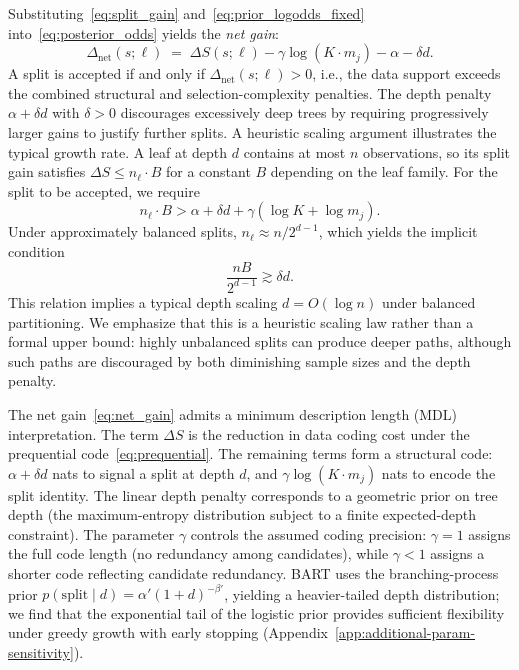 \documentclass[twoside,11pt]{article}
\begin{document}
Substituting~\eqref{eq:split_gain} and~\eqref{eq:prior_logodds_fixed} into~\eqref{eq:posterior_odds} yields the \emph{net gain}:
\begin{equation}\label{eq:net_gain}
\Delta_{\mathrm{net}}(s;\ell)
\;=\;
\Delta S(s;\ell) - \gamma\log(K \cdot m_j) - \alpha - \delta d.
\end{equation}
A split is accepted if and only if $\Delta_{\mathrm{net}}(s;\ell) > 0$, i.e., the data support exceeds the combined structural and selection-complexity penalties.
The depth penalty $\alpha + \delta d$ with $\delta > 0$ discourages excessively deep trees by requiring progressively larger gains to justify further splits. A heuristic scaling argument illustrates the typical growth rate. A leaf at depth $d$ contains at most $n$ observations, so its split gain satisfies $\Delta S \le n_\ell \cdot B$ for a constant $B$ depending on the leaf family. For the split to be accepted, we require
\[
n_\ell \cdot B > \alpha + \delta d + \gamma(\log K + \log m_j).
\]
Under approximately balanced splits, $n_\ell \approx n / 2^{d-1}$, which yields the implicit condition
\[
\frac{n B}{2^{d-1}} \gtrsim \delta d.
\]
This relation implies a typical depth scaling $d = O(\log n)$ under balanced partitioning. We emphasize that this is a heuristic scaling law rather than a formal upper bound: highly unbalanced splits can produce deeper paths, although such paths are discouraged by both diminishing sample sizes and the depth penalty.

\begin{remark}\label{rem:mdl}
The net gain~\eqref{eq:net_gain} admits a minimum description length (MDL) interpretation. The term $\Delta S$ is the reduction in data coding cost under the prequential code~\eqref{eq:prequential}. The remaining terms form a structural code: $\alpha + \delta d$ nats to signal a split at depth $d$, and $\gamma\log(K \cdot m_j)$ nats to encode the split identity. The linear depth penalty corresponds to a geometric prior on tree depth (the maximum-entropy distribution subject to a finite expected-depth constraint). The parameter $\gamma$ controls the assumed coding precision: $\gamma = 1$ assigns the full code length (no redundancy among candidates), while $\gamma < 1$ assigns a shorter code reflecting candidate redundancy. BART \citep{chipman2010bart} uses the branching-process prior $p(\text{split} \mid d) = \alpha'(1+d)^{-\beta'}$, yielding a heavier-tailed depth distribution; we find that the exponential tail of the logistic prior provides sufficient flexibility under greedy growth with early stopping (Appendix~\ref{app:additional-param-sensitivity}).
\end{remark}
\end{document}
